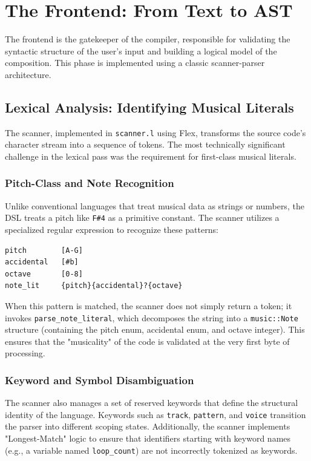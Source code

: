 \section{The Frontend: From Text to AST}\label{sec:implementation-frontend}

The frontend is the gatekeeper of the compiler, responsible for validating the syntactic structure of the
user's input and building a logical model of the composition.
This phase is implemented using a classic scanner-parser architecture.

\subsection{Lexical Analysis: Identifying Musical Literals}

The scanner, implemented in \texttt{scanner.l} using Flex, transforms the source code's character stream into
a sequence of tokens.
The most technically significant challenge in the lexical pass was the requirement for first-class musical literals.

\subsubsection{Pitch-Class and Note Recognition}

Unlike conventional languages that treat musical data as strings or numbers, the DSL treats a pitch like
\texttt{F\#4} as a primitive constant.
The scanner utilizes a specialized regular expression to recognize these patterns:
\begin{lstlisting}[caption={Flex regular expression for note literal recognition.}]
pitch        [A-G]
accidental   [#b]
octave       [0-8]
note_lit     {pitch}{accidental}?{octave}
\end{lstlisting}

When this pattern is matched, the scanner does not simply return a token; it invokes
\texttt{parse\_note\_literal}, which decomposes the string into a \texttt{music::Note} structure (containing
the pitch enum, accidental enum, and octave integer).
This ensures that the "musicality" of the code is validated at the very first byte of processing.

\subsubsection{Keyword and Symbol Disambiguation}

The scanner also manages a set of reserved keywords that define the structural identity of the language.
Keywords such as \texttt{track}, \texttt{pattern}, and \texttt{voice} transition the parser into different
scoping states.
Additionally, the scanner implements "Longest-Match" logic to ensure that identifiers starting with keyword
names (e.g., a variable named \texttt{loop\_count}) are not incorrectly tokenized as keywords.

